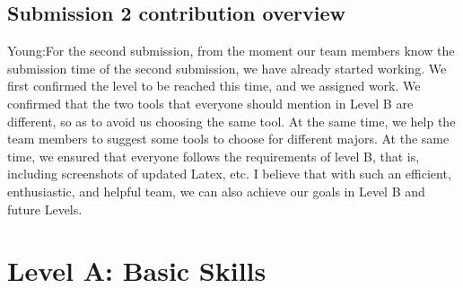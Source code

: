 \documentclass[a4paper, 11pt]{report}
\begin{document}
\subsection{Submission 2 contribution overview}

Young:For the second submission, from the moment our team members know the submission time of the second submission, we have already started working. We first confirmed the level to be reached this time, and we assigned work. We confirmed that the two tools that everyone should mention in Level B are different, so as to avoid us choosing the same tool. At the same time, we help the team members to suggest some tools to choose for different majors. At the same time, we ensured that everyone follows the requirements of level B, that is, including screenshots of updated Latex, etc. I believe that with such an efficient, enthusiastic, and helpful team, we can also achieve our goals in Level B and future Levels.\newline\newline



\newpage
\section{Level A: Basic Skills}
\end{document}
